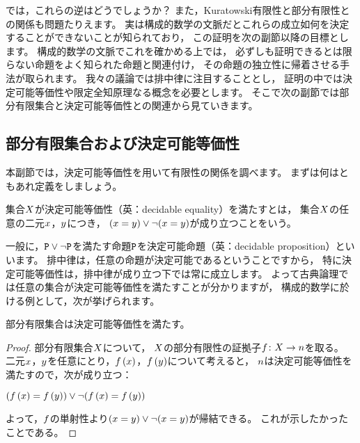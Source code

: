 では，これらの逆はどうでしょうか？
また，Kuratowski有限性と部分有限性との関係も問題たりえます。
実は構成的数学の文脈だとこれらの成立如何を決定することができないことが知られており，
この証明を次の副節以降の目標とします。
構成的数学の文脈でこれを確かめる上では，
必ずしも証明できるとは限らない命題をよく知られた命題と関連付け，
その命題の独立性に帰着させる手法が取られます。
我々の議論では排中律に注目することとし，
証明の中では決定可能等価性や限定全知原理なる概念を必要とします。
そこで次の副節では部分有限集合と決定可能等価性との関連から見ていきます。

\subsection{部分有限集合および決定可能等価性}

本副節では，決定可能等価性を用いて有限性の関係を調べます。
まずは何はともあれ定義をしましょう。

\begin{definition}
    集合\(\Set\)が決定可能等価性（英：decidable equality）を満たすとは，
    集合\(\Set\)の任意の二元\(\Element\)，\(\Element<y>\)につき，
    \((\Element=\Element<y>)\OR\NOT(\Element=\Element<y>)\)が成り立つことをいう。
\end{definition}
一般に，\(\Proposition\OR\NOT\Proposition\)を満たす命題\(\Proposition\)を決定可能命題（英：decidable proposition）といいます。
排中律は，任意の命題が決定可能であるということですから，
特に決定可能等価性は，排中律が成り立つ下では常に成立します。
よって古典論理では任意の集合が決定可能等価性を満たすことが分かりますが，
構成的数学に於ける例として，次が挙げられます。

\begin{proposition}\label{prop::all_subfinite_has_decidable_equality}
    部分有限集合は決定可能等価性を満たす。
\end{proposition}

\begin{proof}
    部分有限集合\(\Set\)について，
    \(\Set\)の部分有限性の証拠子\(\FunctionStyle{\Map}{\Set}{\NaturalNumber}\)を取る。
    二元\(\Element\)，\(\Element<y>\)を任意にとり，\(\Map(\Element)\)，\(\Map(\Element<y>)\)について考えると，
    \(\NaturalNumber\)は決定可能等価性を満たすので，次が成り立つ：
    \begin{center}
        \((\Map(\Element)=\Map(\Element<y>))\OR\NOT(\Map(\Element)=\Map(\Element<y>))\)
    \end{center}
    よって，\(\Map\)の単射性より\((\Element=\Element<y>)\OR\NOT(\Element=\Element<y>)\)が帰結できる。
    これが示したかったことである。
\end{proof}

